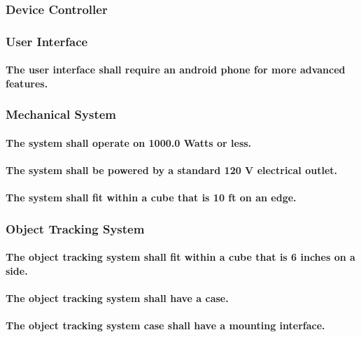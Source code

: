 \subsubsection{Device Controller}

\subsubsection{User Interface}
\paragraph{The user interface shall require an android phone for more advanced features. }

\subsubsection{Mechanical System}
\paragraph{The system shall operate on 1000.0 Watts or less.}
\paragraph{The system shall be powered by a standard 120 V electrical outlet. }
\paragraph{The system shall fit within a cube that is 10 ft on an edge.}

\subsubsection{Object Tracking System}
\paragraph{The object tracking system shall fit within a cube that is 6 inches on a side.}
\paragraph{The object tracking system shall have a case. }
\paragraph{The object tracking system case shall have a mounting interface. }




